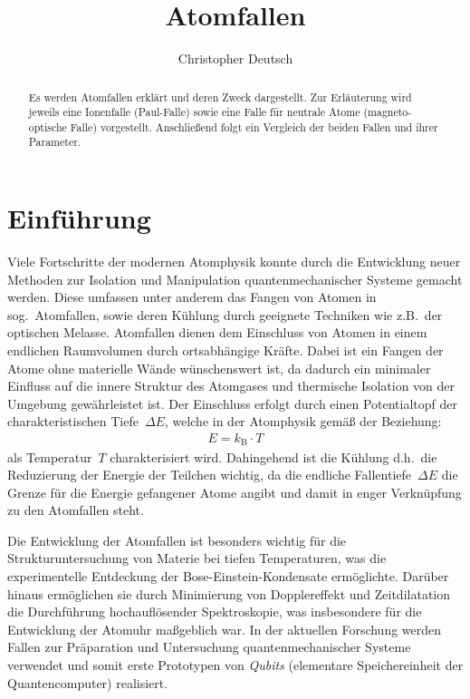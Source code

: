 \documentclass[twocolumn]{revtex4}
\begin{document}
\title{Atomfallen}

\author{Christopher Deutsch}




\begin{abstract}
%
Es werden Atomfallen erklärt und deren Zweck dargestellt. Zur Erläuterung wird jeweils eine Ionenfalle (Paul-Falle) sowie eine Falle für neutrale Atome (magneto-optische Falle) vorgestellt. Anschließend folgt ein Vergleich der beiden Fallen und ihrer Parameter.
%
\end{abstract}

\maketitle

\section{Einführung}
Viele Fortschritte der modernen Atomphysik konnte durch die Entwicklung neuer Methoden zur Isolation und Manipulation quantenmechanischer Systeme gemacht werden.
Diese umfassen unter anderem das Fangen von Atomen in sog.~Atomfallen, sowie deren Kühlung durch geeignete Techniken wie z.B.\ der optischen Melasse.
Atomfallen dienen dem Einschluss von Atomen in einem endlichen Raumvolumen durch ortsabhängige Kräfte. 
Dabei ist ein Fangen der Atome ohne materielle Wände wünschenswert ist, da dadurch ein minimaler Einfluss auf die innere Struktur des Atomgases und thermische Isolation von der Umgebung gewährleistet ist.
Der Einschluss erfolgt durch einen Potentialtopf der charakteristischen Tiefe~$\Delta E$, welche in der Atomphysik gemäß der Beziehung:
\begin{align}
	E = k_\mathrm{B} \cdot T
\end{align}
als Temperatur~$T$ charakterisiert wird.
Dahingehend ist die Kühlung d.h.\ die Reduzierung der Energie der Teilchen wichtig, da die endliche Fallentiefe~$\Delta E$ die Grenze für die Energie gefangener Atome angibt und damit in enger Verknüpfung zu den Atomfallen steht.

Die Entwicklung der Atomfallen ist besonders wichtig für die Strukturuntersuchung von Materie bei tiefen Temperaturen, was die experimentelle Entdeckung der Bose-Einstein-Kondensate ermöglichte.
Darüber hinaus ermöglichen sie durch Minimierung von Dopplereffekt und Zeitdilatation die Durchführung hochauflösender Spektroskopie, was insbesondere für die Entwicklung der Atomuhr maßgeblich war.
In der aktuellen Forschung werden Fallen zur Präparation und Untersuchung quantenmechanischer Systeme verwendet und somit erste Prototypen von \emph{Qubits} (elementare Speichereinheit der Quantencomputer) realisiert.
\end{document}
